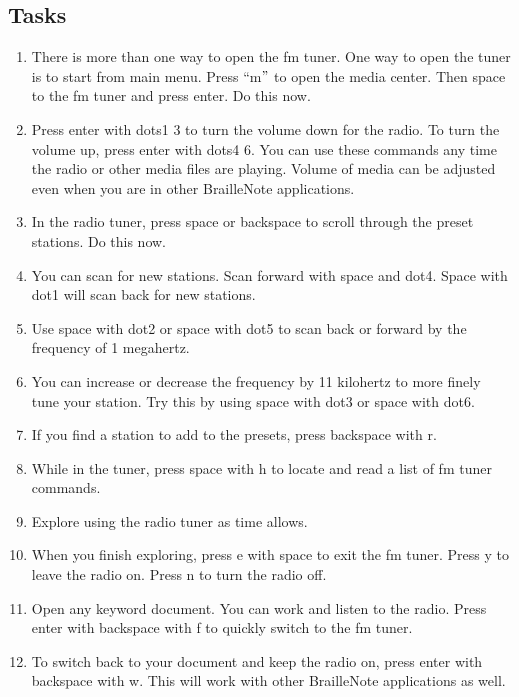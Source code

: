 \documentclass[10pt,letterpaper,twoside]{report}
\begin{document}
{{{\subsection{Tasks}
	      \begin{enumerate}
		      \item There is more than one way to open the fm tuner. One way to open the tuner is to start from main menu. Press ``m$"$  to open the media center. Then space to the fm tuner and press enter. Do this now.
		      \item Press enter with dots1 3 to turn the volume down for the radio. To turn the volume up, press enter with dots4 6. You can use these commands any time the radio or other media files are playing. Volume of media can be adjusted even when you are in other BrailleNote applications.
		      \item In the radio tuner, press space or backspace to scroll through the preset stations. Do this now.
		      \item You can scan for new stations. Scan forward with space and dot4. Space with dot1 will scan back for new stations.
		      \item Use space with dot2 or space with dot5 to scan back or forward by the frequency of 1 megahertz.
		      \item You can increase or decrease the frequency by 11 kilohertz to more finely tune your station. Try this by using space with dot3 or space with dot6.
		      \item If you find a station to add to the presets, press backspace with r.
		      \item While in the tuner, press space with h to locate and read a list of fm tuner commands.
		      \item Explore using the radio tuner as time allows.
		      \item When you finish exploring, press e with space to exit the fm tuner. Press y to leave the radio on. Press n to turn the radio off.
		      \item Open any keyword document. You can work and listen to the radio. Press enter with backspace with f to quickly switch to the fm tuner.
		      \item To switch back to your document and keep the radio on, press enter with backspace with w. This will work with other BrailleNote applications as well.
	      \end{enumerate}
	      \clearpage
}}}
\end{document}
